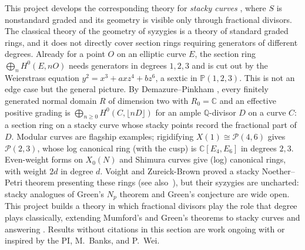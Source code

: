 \documentclass[11pt,reqno]{amsart}
\theoremstyle{remark}
\newcommand{\CC}{\mathbb{C}}
\newcommand{\PP}{\mathbb{P}}
\newcommand{\QQ}{\mathbb{Q}}
\newcommand{\cP}{\mathcal{P}}
\begin{document}
This project develops the corresponding theory for \emph{stacky curves} \cite{abramovichVistoli02,cadman07,AGV08}, where $S$ is nonstandard graded and its geometry is visible only through fractional divisors. The classical theory of the geometry of syzygies is a theory of standard graded rings, and it does not directly cover section rings requiring generators of different degrees. Already for a point $O$ on an elliptic curve $E$, the section ring $\bigoplus_n H^0(E,nO)$ needs generators in degrees $1,2,3$ and is cut out by the Weierstrass equation $y^2=x^3+axz^4+bz^6$, a sextic in $\PP(1,2,3)$. This is not an edge case but the general picture. By Demazure--Pinkham \cite{pinkham77,demazure88,watanabe81}, every finitely generated normal domain $R$ of dimension two with $R_0=\CC$ and an effective positive grading is $\bigoplus_{n\ge0}H^0(C,\lfloor nD\rfloor)$ for an ample $\QQ$-divisor $D$ on a curve $C$: a section ring on a stacky curve whose stacky points record the fractional part of $D$. Modular curves are flagship examples; rigidifying $X(1)\cong \cP(4,6)$ gives $\cP(2,3)$, whose log canonical ring (with the cusp) is $\CC[E_4,E_6]$ in degrees $2,3$. Even-weight forms on $X_0(N)$ and Shimura curves give (log) canonical rings, with weight $2d$ in degree $d$. Voight and Zureick-Brown \cite{voightZurieckBrown22} proved a stacky Noether--Petri theorem presenting these rings (see also~\cite{odorney15,LRZ16}), but their syzygies are uncharted: stacky analogues of Green's $N_p$ theorem and Green's conjecture are wide open. This project builds a theory in which fractional divisors play the role that degree plays classically, extending Mumford's and Green's theorems to stacky curves and answering \cite[Ques.~7.7]{brownErman25}. Results without citations in this section are work ongoing with or inspired by the PI, M.~Banks, and P.~Wei. 
\end{document}
